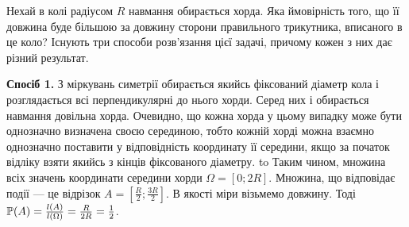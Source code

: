 \begin{example}
    Нехай в колі радіусом $R$ навмання обирається хорда. Яка ймовірність того, 
    що її довжина буде більшою за довжину сторони правильного трикутника, 
    вписаного в це коло?
    \newline
    Існують три способи розв'язання цієї задачі, причому кожен з них дає різний результат.
    
    \textbf{Спосіб 1.}
    З міркувань симетрії обирається якийсь фіксований діаметр кола і розглядається
    всі перпендикулярні до нього хорди. Серед них і обирається навмання довільна хорда.
    Очевидно, що кожна хорда у цьому випадку може бути однозначно визначена своєю серединою,
    тобто кожній хорді можна взаємно однозначно поставити у відповідність координату її середини,
    якщо за початок відліку взяти якийсь з кінців фіксованого діаметру.
    \newline
    \hbox to 
    Таким чином, множина всіх значень координати середини хорди $\Omega = \left[0; 2R\right]$. 
    Множина, що відповідає події --- це відрізок $A = \left[\frac{R}{2}; \frac{3R}{2}\right]$.
    В якості міри візьмемо довжину. Тоді $\P(A) = \frac{l(A)}{l(\Omega)} = \frac{R}{2R}= \frac{1}{2}$.
    

\end{example}
